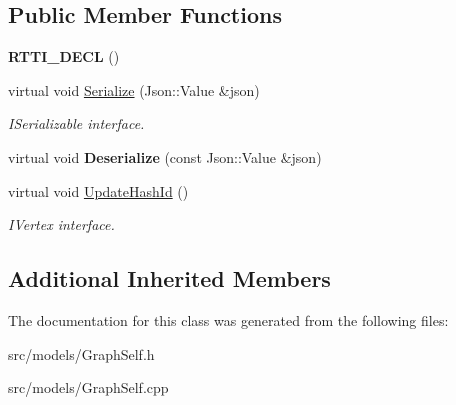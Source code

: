 \subsection*{Public Member Functions}
\begin{DoxyCompactItemize}
\item 
\mbox{\label{class_graph_self_1_1_vertex_adb2fa7db72ef32a89d39b89a117ee6ef}} 
{\bfseries R\+T\+T\+I\+\_\+\+D\+E\+CL} ()
\item 
\mbox{\label{class_graph_self_1_1_vertex_a89999cafe7855f7bc131cf213f8f2ac0}} 
virtual void \hyperlink{class_graph_self_1_1_vertex_a89999cafe7855f7bc131cf213f8f2ac0}{Serialize} (Json\+::\+Value \&json)
\begin{DoxyCompactList}\small\item\em I\+Serializable interface. \end{DoxyCompactList}\item 
\mbox{\label{class_graph_self_1_1_vertex_aa9cb35a09789ecea1f637b67c981378f}} 
virtual void {\bfseries Deserialize} (const Json\+::\+Value \&json)
\item 
\mbox{\label{class_graph_self_1_1_vertex_a4885ab897947cd5896e768bb128c6283}} 
virtual void \hyperlink{class_graph_self_1_1_vertex_a4885ab897947cd5896e768bb128c6283}{Update\+Hash\+Id} ()
\begin{DoxyCompactList}\small\item\em I\+Vertex interface. \end{DoxyCompactList}\end{DoxyCompactItemize}
\subsection*{Additional Inherited Members}


The documentation for this class was generated from the following files\+:\begin{DoxyCompactItemize}
\item 
src/models/Graph\+Self.\+h\item 
src/models/Graph\+Self.\+cpp\end{DoxyCompactItemize}

